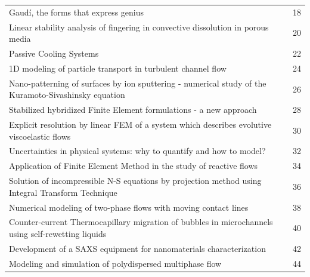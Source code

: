 \documentclass[11pt,a4paper]{book} %
\begin{document}
\hspace{-8mm}
\begin{tabular}{lc}
	Gaudí, the forms that express genius & 18\\
	Linear stability analysis of fingering in convective dissolution in porous media & 20\\
	Passive Cooling Systems & 22\\
	1D modeling of particle transport in turbulent channel flow & 24\\
	Nano-patterning of surfaces by ion sputtering - numerical study of the Kuramoto-Sivashinsky equation & 26\\
	Stabilized hybridized Finite Element formulations - a new approach & 28\\
	Explicit resolution by linear FEM of a system which describes evolutive viscoelastic flows & 30\\
	Uncertainties in physical systems: why to quantify and how to model? & 32\\
	Application of Finite Element Method in the study of reactive flows & 34\\
	Solution of incompressible N-S equations by projection method using Integral Transform Technique & 36\\
	Numerical modeling of two-phase flows with moving contact lines & 38\\
	Counter-current Thermocapillary migration of bubbles in microchannels using self-rewetting liquids & 40\\
	Development of a SAXS equipment for nanomaterials characterization & 42\\
	Modeling and simulation of polydispersed multiphase flow & 44\\
\end{tabular}


%
%
%
%
%
%
%
%
%
%
%
%
%
%
\end{document}
